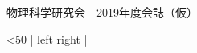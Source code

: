 \documentclass[11pt,b5paper,papersize,dvipdfmx]{jsbook}
\begin{document}
\thispagestyle{empty}

\begin{center}
  {\Large 物理科学研究会　2019年度会誌（仮）}
\end{center}

\newcommand\looploop[2]{
  \setcounter{counter}{0}
  \loop\ifnum\value{counter}<#1
    #2\ignorespaces
  \repeat
}

\looploop{50}{\noindent| left \hfill \the\value{counter} \hfill right |\par}


\cleardoublepage

%
%
\end{document}
